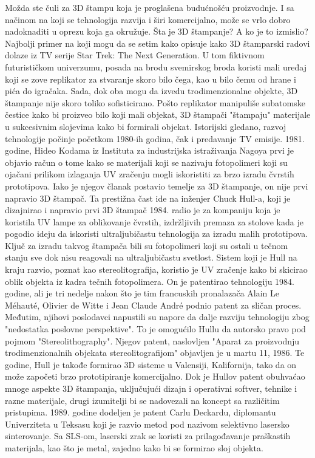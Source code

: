 \documentclass[a4paper]{article}
\begin{document}
{\bigbreak Možda ste čuli za 3D štampu koja je proglašena budućnošću proizvodnje. I sa načinom na koji se tehnologija razvija i širi komercijalno, može se vrlo dobro nadoknaditi u oprezu koja ga okružuje. Šta je 3D štampanje? A ko je to izmislio? 
\bigbreak Najbolji primer na koji mogu da se setim kako opisuje kako 3D štamparski radovi dolaze iz TV serije Star Trek: The Next Generation. U tom fiktivnom futurističkom univerzumu, posada na brodu svemirskog broda koristi mali uređaj koji se zove replikator za stvaranje skoro bilo čega, kao u bilo čemu od hrane i pića do igračaka. 
\bigbreak Sada, dok oba mogu da izvedu trodimenzionalne objekte, 3D štampanje nije skoro toliko sofisticirano. Pošto replikator manipuliše subatomske čestice kako bi proizveo bilo koji mali objekat, 3D štampači "štampaju" materijale u sukcesivnim slojevima kako bi formirali objekat. 
\bigbreak Istorijski gledano, razvoj tehnologije počinje početkom 1980-ih godina, čak i predavanje TV emisije. 1981. godine, Hideo Kodama iz Instituta za industrijska istraživanja Nagoya prvi je objavio račun o tome kako se materijali koji se nazivaju fotopolimeri koji su ojačani prilikom izlaganja UV zračenju mogli iskoristiti za brzo izradu čvrstih prototipova. Iako je njegov članak postavio temelje za 3D štampanje, on nije prvi napravio 3D štampač. 
\bigbreak Ta prestižna čast ide na inženjer Chuck Hull-a, koji je dizajnirao i napravio prvi 3D štampač 1984. radio je za kompaniju koja je koristila UV lampe za oblikovanje čvrstih, izdržljivih premaza za stolove kada je pogodio ideju da iskoristi ultraljubičastu tehnologija za izradu malih prototipova. 
\bigbreak Ključ za izradu takvog štampača bili su fotopolimeri koji su ostali u tečnom stanju sve dok nisu reagovali na ultraljubičastu svetlost. Sistem koji je Hull na kraju razvio, poznat kao stereolitografija, koristio je UV zračenje kako bi skicirao oblik objekta iz kadra tečnih fotopolimera. 
\bigbreak On je patentirao tehnologiju 1984. godine, ali je tri nedelje nakon što je tim francuskih pronalazača Alain Le Méhauté, Olivier de Witte i Jean Claude André podnio patent za sličan proces. Međutim, njihovi poslodavci napustili su napore da dalje razviju tehnologiju zbog "nedostatka poslovne perspektive". To je omogućilo Hullu da autorsko pravo pod pojmom "Stereolithography". Njegov patent, naslovljen "Aparat za proizvodnju trodimenzionalnih objekata stereolitografijom" objavljen je u martu 11, 1986. Te godine, Hull je takođe formirao 3D sisteme u Valensiji, Kalifornija, tako da on može započeti brzo prototipiranje komercijalno. 
Dok je Hullov patent obuhvaćao mnoge aspekte 3D štampanja, uključujući dizajn i operativni softver, tehnike i razne materijale, drugi izumitelji bi se nadovezali na koncept sa različitim pristupima. 1989. godine dodeljen je patent Carlu Deckardu, diplomantu Univerziteta u Teksasu koji je razvio metod pod nazivom selektivno lasersko sinterovanje. Sa SLS-om, laserski zrak se koristi za prilagođavanje praškastih materijala, kao što je metal, zajedno kako bi se formirao sloj objekta. 
}
\end{document}

